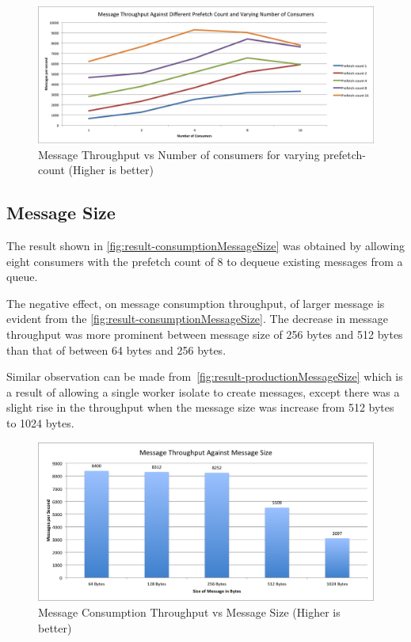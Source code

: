 \begin{figure}[H]
  \centering
  \includegraphics[width=1\textwidth]{figures/01prefetch}
  \caption[Message Throughput vs Number of consumers for varying prefetch-count]{Message Throughput vs Number of consumers for varying prefetch-count (Higher is better)}
  \label{fig:result-prefetch}
\end{figure}

\subsection{Message Size}
\label{subsec:messageSize}
The result shown in \autoref{fig:result-consumptionMessageSize} was obtained by allowing eight consumers with the prefetch count of 8 to dequeue existing messages from a queue.

  The negative effect, on message consumption throughput, of larger message is evident from the  \autoref{fig:result-consumptionMessageSize}. The decrease in message throughput was more prominent between message size of 256 bytes and 512 bytes than that of between 64 bytes and 256 bytes.

  Similar observation can be made from~\autoref{fig:result-productionMessageSize} which is a result of allowing a single worker isolate to create messages, except there was a slight rise in the throughput when the message size was increase from 512 bytes to 1024 bytes.

\begin{figure}[H]
  \centering  \includegraphics[width=1\textwidth]{figures/02consumptionMessageSize}
  \caption[Message Consumption Throughput vs Message Size]{Message Consumption Throughput vs Message Size (Higher is better)}
  \label{fig:result-consumptionMessageSize}
\end{figure}

